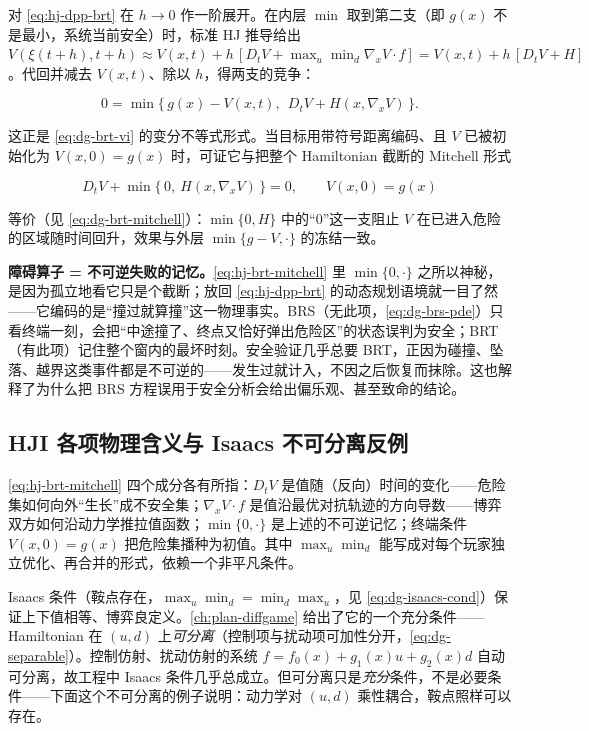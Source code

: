 \begin{derivation}
对 \cref{eq:hj-dpp-brt} 在 $h\to0$ 作一阶展开。在内层 $\min$ 取到第二支（即 $g(x)$ 不是最小，系统当前安全）时，标准 HJ 推导给出 $V(\xi(t{+}h),t{+}h)\approx V(x,t)+h\,[D_tV+\max_u\min_d\nabla_xV\cdot f]=V(x,t)+h\,[D_tV+H]$。代回并减去 $V(x,t)$、除以 $h$，得两支的竞争：

\[
0=\min\Big\{\,g(x)-V(x,t),\ \ D_tV+H(x,\nabla_xV)\,\Big\}.
\]

这正是 \cref{eq:dg-brt-vi} 的变分不等式形式。当目标用带符号距离编码、且 $V$ 已被初始化为 $V(x,0)=g(x)$ 时，可证它与把整个 Hamiltonian 截断的 Mitchell 形式

\begin{equation}
  D_tV+\min\big\{\,0,\ H(x,\nabla_xV)\,\big\}=0,\qquad V(x,0)=g(x)
  \label{eq:hj-brt-mitchell}
\end{equation}

等价（见 \cref{eq:dg-brt-mitchell}）：$\min\{0,H\}$ 中的“$0$”这一支阻止 $V$ 在已进入危险的区域随时间回升，效果与外层 $\min\{g-V,\cdot\}$ 的冻结一致。
\end{derivation}

\begin{insight}
\textbf{障碍算子 = 不可逆失败的记忆。}\;\cref{eq:hj-brt-mitchell} 里 $\min\{0,\cdot\}$ 之所以神秘，是因为孤立地看它只是个截断；放回 \cref{eq:hj-dpp-brt} 的动态规划语境就一目了然——它编码的是“撞过就算撞”这一物理事实。BRS（无此项，\cref{eq:dg-brs-pde}）只看终端一刻，会把“中途撞了、终点又恰好弹出危险区”的状态误判为安全；BRT（有此项）记住整个窗内的最坏时刻。安全验证几乎总要 BRT，正因为碰撞、坠落、越界这类事件都是不可逆的——发生过就计入，不因之后恢复而抹除。这也解释了为什么把 BRS 方程误用于安全分析会给出偏乐观、甚至致命的结论。
\end{insight}

\subsection{HJI 各项物理含义与 Isaacs 不可分离反例}
\label{sec:hj-isaacs}

\cref{eq:hj-brt-mitchell} 四个成分各有所指：$D_tV$ 是值随（反向）时间的变化——危险集如何向外“生长”成不安全集；$\nabla_xV\cdot f$ 是值沿最优对抗轨迹的方向导数——博弈双方如何沿动力学推拉值函数；$\min\{0,\cdot\}$ 是上述的不可逆记忆；终端条件 $V(x,0)=g(x)$ 把危险集播种为初值。其中 $\max_u\min_d$ 能写成对每个玩家独立优化、再合并的形式，依赖一个非平凡条件。

Isaacs 条件（鞍点存在，$\max_u\min_d=\min_d\max_u$，见 \cref{eq:dg-isaacs-cond}）保证上下值相等、博弈良定义。\cref{ch:plan-diffgame} 给出了它的一个充分条件——Hamiltonian 在 $(u,d)$ 上\emph{可分离}（控制项与扰动项可加性分开，\cref{eq:dg-separable}）。控制仿射、扰动仿射的系统 $f=f_0(x)+g_1(x)u+g_2(x)d$ 自动可分离，故工程中 Isaacs 条件几乎总成立。但可分离只是\emph{充分}条件，不是必要条件——下面这个不可分离的例子说明：动力学对 $(u,d)$ 乘性耦合，鞍点照样可以存在。

